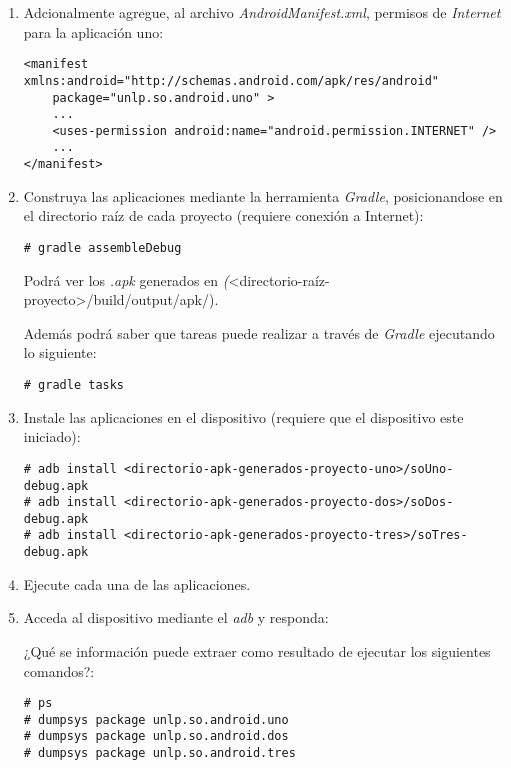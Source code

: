 \begin{itemize}
\begin{enumerate}
	  \item Adcionalmente agregue, al archivo \textit{AndroidManifest.xml},  permisos de \emph{Internet} para la aplicación uno:
	  \begin{lstlisting}
<manifest xmlns:android="http://schemas.android.com/apk/res/android"
    package="unlp.so.android.uno" >
    ...
    <uses-permission android:name="android.permission.INTERNET" />
    ...
</manifest>
	  \end{lstlisting}
	  
	  \item Construya las aplicaciones mediante la herramienta \textit{Gradle}, posicionandose en el directorio raíz de cada proyecto (requiere conexión a Internet):
	  \begin{lstlisting}
# gradle assembleDebug
	  \end{lstlisting}
	  Podrá ver los \textit{.apk} generados en \emph(<directorio-raíz-proyecto>/build/output/apk/). 
	  
	  Además podrá saber que tareas puede realizar a través de \textit{Gradle} ejecutando lo siguiente:
	  \begin{lstlisting}
# gradle tasks
	  \end{lstlisting}
	   
	  \item Instale las aplicaciones en el dispositivo (requiere que el dispositivo este iniciado):
	  \begin{lstlisting}
# adb install <directorio-apk-generados-proyecto-uno>/soUno-debug.apk
# adb install <directorio-apk-generados-proyecto-dos>/soDos-debug.apk
# adb install <directorio-apk-generados-proyecto-tres>/soTres-debug.apk
	  \end{lstlisting}
	  
	  \item Ejecute cada una de las aplicaciones.
	  
	  \item Acceda al dispositivo mediante el \textit{adb} y responda:
	  \begin{questions}
	      \question ¿Qué se información puede extraer como resultado de ejecutar los siguientes comandos?:
	      \begin{lstlisting}
# ps	      
# dumpsys package unlp.so.android.uno
# dumpsys package unlp.so.android.dos
# dumpsys package unlp.so.android.tres
	      \end{lstlisting}
	  \end{questions}
	  

\end{enumerate}
\end{itemize}
